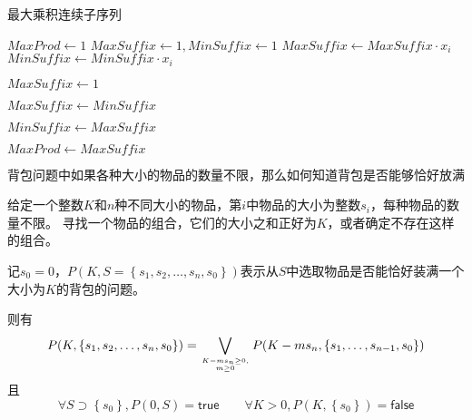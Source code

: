 \documentclass[answers]{exam}
\begin{document}
\begin{questions}
\begin{solution}
        \begin{algorithm}[H]
            \caption{最大乘积连续子序列}
            \begin{algorithmic}[1]
                \State $MaxProd \gets 1$ 
                \State $MaxSuffix \gets 1, MinSuffix \gets 1$ 
                \State $MaxSuffix \gets MaxSuffix \cdot x_i$
                \State $MinSuffix \gets MinSuffix \cdot x_i$

                \State $MaxSuffix \gets 1$
                \EndIf

                \State $MaxSuffix \gets MinSuffix$
                \EndIf

                \State $MinSuffix \gets MaxSuffix$
                \EndIf

                \State $MaxProd \gets MaxSuffix$
                \EndIf
                \EndFor
            \end{algorithmic}
        \end{algorithm}
    \end{solution}

    \newpage %

    \question 背包问题中如果各种大小的物品的数量不限，那么如何知道背包是否能够恰好放满

    {\kaishu
    给定一个整数$K$和$n$种不同大小的物品，第$i$中物品的大小为整数$s_i$，每种物品的数量不限。
    寻找一个物品的组合，它们的大小之和正好为$K$，或者确定不存在这样的组合。
    }

    \begin{solution}
        记$s_0 = 0$，$P\left(K, S=\left\{s_1, s_2, \dots, s_n, s_0\right\}\right)$表示从$S$中选取物品是否能恰好装满一个大小为$K$的背包的问题。

        则有$$
            P(K, \left\{s_1, s_2, \dots, s_n, s_0\right\}) = \bigvee_{K-ms_n \geq 0, \atop m \geq 0} P(K - ms_n, \left\{s_1, \dots, s_{n-1}, s_0\right\})
        $$
        且$$
            \forall S \supset \left\{s_0\right\},  P(0, S) = \mathsf{true} \quad\quad \forall K > 0, P(K,\left\{s_0\right\})=\mathsf{false}
        $$


\end{solution}
\end{questions}
\end{document}
